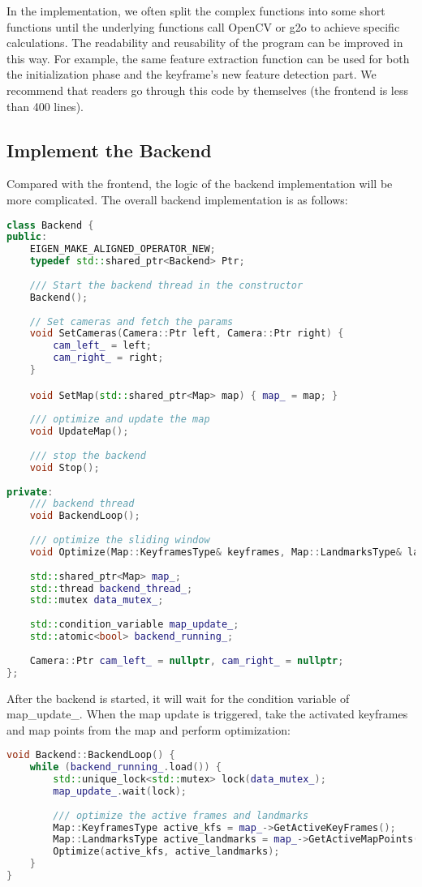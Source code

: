 In the implementation, we often split the complex functions into some short functions until the underlying functions call OpenCV or g2o to achieve specific calculations. The readability and reusability of the program can be improved in this way. For example, the same feature extraction function can be used for both the initialization phase and the keyframe's new feature detection part. We recommend that readers go through this code by themselves (the frontend is less than 400 lines).

\subsection{Implement the Backend}
Compared with the frontend, the logic of the backend implementation will be more complicated. The overall backend implementation is as follows:
\begin{lstlisting}[language=c++,caption=slambook2/ch13/include/myslam/backend.h]
class Backend {
public:
	EIGEN_MAKE_ALIGNED_OPERATOR_NEW;
	typedef std::shared_ptr<Backend> Ptr;
	
	/// Start the backend thread in the constructor 
	Backend();
	
	// Set cameras and fetch the params
	void SetCameras(Camera::Ptr left, Camera::Ptr right) {
		cam_left_ = left;
		cam_right_ = right;
	}

	void SetMap(std::shared_ptr<Map> map) { map_ = map; }
	
	/// optimize and update the map
	void UpdateMap();
	
	/// stop the backend
	void Stop();
	
private:
	/// backend thread
	void BackendLoop();
	
	/// optimize the sliding window
	void Optimize(Map::KeyframesType& keyframes, Map::LandmarksType& landmarks);
	
	std::shared_ptr<Map> map_;
	std::thread backend_thread_;
	std::mutex data_mutex_;
	
	std::condition_variable map_update_;
	std::atomic<bool> backend_running_;
	
	Camera::Ptr cam_left_ = nullptr, cam_right_ = nullptr;
};
\end{lstlisting}

After the backend is started, it will wait for the condition variable of map\_update\_. When the map update is triggered, take the activated keyframes and map points from the map and perform optimization:
\begin{lstlisting}[language=c++,caption=slambook2/ch13/src/backend.cpp]
void Backend::BackendLoop() {
	while (backend_running_.load()) {
		std::unique_lock<std::mutex> lock(data_mutex_);
		map_update_.wait(lock);
		
		/// optimize the active frames and landmarks
		Map::KeyframesType active_kfs = map_->GetActiveKeyFrames();
		Map::LandmarksType active_landmarks = map_->GetActiveMapPoints();
		Optimize(active_kfs, active_landmarks);
	}
}
\end{lstlisting}

